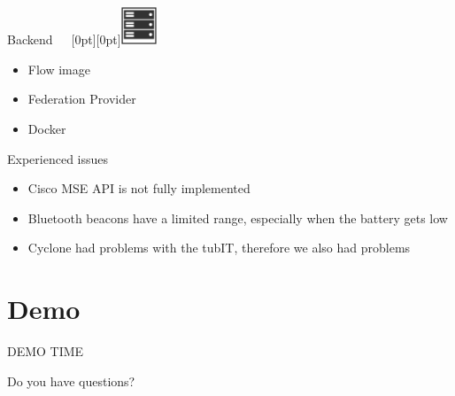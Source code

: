 \documentclass[11pt]{beamer}
\begin{document}
\begin{frame}{Backend~~~\raisebox{-6pt}[0pt][0pt]{\includegraphics[width=0.08\textwidth]{tech-stack-backend}}}

  \begin{itemize}
    \item Flow image
    \item Federation Provider
    \item Docker
  \end{itemize}

\end{frame}

\begin{frame}{Experienced issues}

  \begin{itemize}
    \item Cisco MSE API is not fully implemented
    \item Bluetooth beacons have a limited range, especially when the battery gets low
    \item Cyclone had problems with the tubIT, therefore we also had problems
  \end{itemize}
\end{frame}

\section{Demo}

\begin{frame}{}

  \begin{center}

    {\Huge DEMO TIME}

    \end{center}

\end{frame}

\begin{frame}{}

	\begin{center}

		{\Huge Do you have questions?}

    \end{center}

\end{frame}
\end{document}
